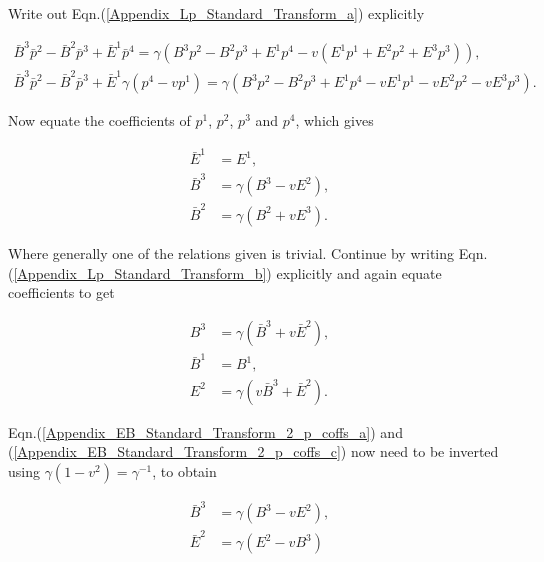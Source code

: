 \begin{appendix}
\noindent Write out Eqn.(\ref{Appendix_Lp_Standard_Transform_a}) explicitly

\begin{gather*}
\bar{B}^3 \bar{p}^2 - \bar{B}^2 \bar{p}^3 + \bar{E}^1 \bar{p}^4 = \gamma(B^3p^2 - B^2 p^3 + E^1p^4 - v(E^1p^1 + E^2 p^2 + E^3p^3)),\\
\bar{B}^3 \bar{p}^2 - \bar{B}^2 \bar{p}^3 + \bar{E}^1 \gamma(p^4 - vp^1) = \gamma(B^3p^2 - B^2 p^3 + E^1p^4 - vE^1p^1 -v E^2 p^2 -v E^3p^3).
\end{gather*}

\noindent Now equate the coefficients of $p^1$, $p^2$, $p^3$ and $p^4$, which gives

\begin{subequations}
\begin{align}
\label{Appendix_EB_Standard_Transform_1_p_coffs_a}
\bar{E}^1 & = E^1,
\\\label{Appendix_EB_Standard_Transform_1_p_coffs_b}
\bar{B}^3 & = \gamma(B^3 - vE^2),
\\\label{Appendix_EB_Standard_Transform_1_p_coffs_b}
\bar{B}^2 & = \gamma(B^2 + vE^3).
\end{align}
\end{subequations}

\noindent Where generally one of the relations given is trivial. Continue by writing Eqn.(\ref{Appendix_Lp_Standard_Transform_b}) explicitly and again equate coefficients to get

\begin{align}
\label{Appendix_EB_Standard_Transform_2_p_coffs_a}
B^3 & = \gamma (\bar{B}^3 + v \bar{E}^2),
\\\label{Appendix_EB_Standard_Transform_2_p_coffs_b}
\bar{B}^1 & = {B}^1,
\\\label{Appendix_EB_Standard_Transform_2_p_coffs_c}
E^2 & = \gamma(v\bar{B}^3 + \bar{E}^2).
\end{align}

\noindent Eqn.(\ref{Appendix_EB_Standard_Transform_2_p_coffs_a}) and (\ref{Appendix_EB_Standard_Transform_2_p_coffs_c}) now need to be inverted using $\gamma (1-v^2) = \gamma^{-1}$, to obtain

\begin{subequations}
\begin{align}
\label{Appendix_EB_Standard_Transform_2_p_coeffs_Inverted_a}
\bar{B}^3 & = \gamma (B^3 - vE^2),
\\\label{Appendix_EB_Standard_Transform_2_p_coeffs_Inverted_b}
\bar{E}^2 & = \gamma (E^2 - vB^3)
\end{align}
\end{subequations}


\end{appendix}
